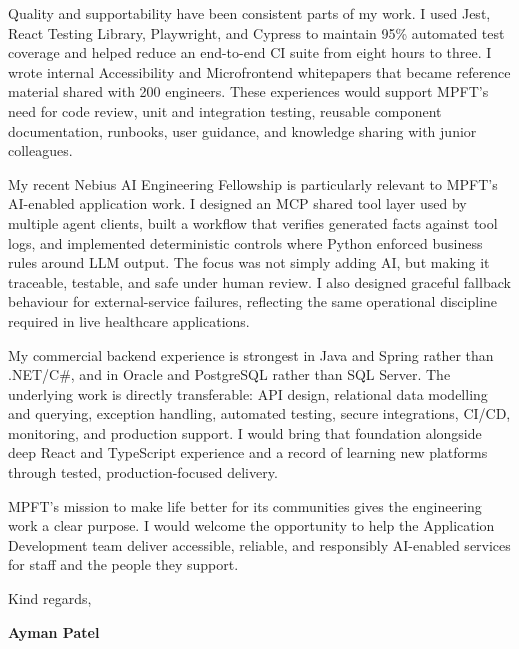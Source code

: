 \documentclass[a4paper,10.5pt]{article}
\begin{document}
Quality and supportability have been consistent parts of my work. I used Jest, React Testing Library, Playwright, and Cypress to maintain 95\% automated test coverage and helped reduce an end-to-end CI suite from eight hours to three. I wrote internal Accessibility and Microfrontend whitepapers that became reference material shared with 200 engineers. These experiences would support MPFT's need for code review, unit and integration testing, reusable component documentation, runbooks, user guidance, and knowledge sharing with junior colleagues.

My recent Nebius AI Engineering Fellowship is particularly relevant to MPFT's AI-enabled application work. I designed an MCP shared tool layer used by multiple agent clients, built a workflow that verifies generated facts against tool logs, and implemented deterministic controls where Python enforced business rules around LLM output. The focus was not simply adding AI, but making it traceable, testable, and safe under human review. I also designed graceful fallback behaviour for external-service failures, reflecting the same operational discipline required in live healthcare applications.

My commercial backend experience is strongest in Java and Spring rather than .NET/C\#, and in Oracle and PostgreSQL rather than SQL Server. The underlying work is directly transferable: API design, relational data modelling and querying, exception handling, automated testing, secure integrations, CI/CD, monitoring, and production support. I would bring that foundation alongside deep React and TypeScript experience and a record of learning new platforms through tested, production-focused delivery.

MPFT's mission to make life better for its communities gives the engineering work a clear purpose. I would welcome the opportunity to help the Application Development team deliver accessible, reliable, and responsibly AI-enabled services for staff and the people they support.

\vspace{2pt}
Kind regards,

\vspace{2pt}
{\color{accent}\textbf{Ayman Patel}}
\end{document}
